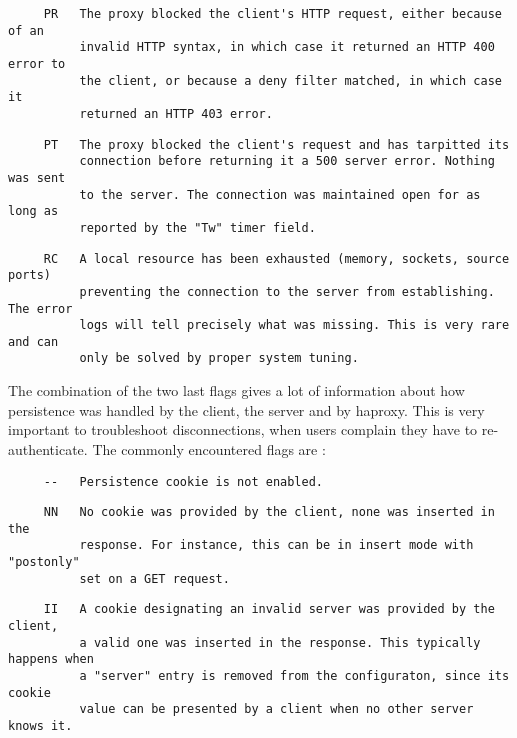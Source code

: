 \begin{verbatim}
     PR   The proxy blocked the client's HTTP request, either because of an
          invalid HTTP syntax, in which case it returned an HTTP 400 error to
          the client, or because a deny filter matched, in which case it
          returned an HTTP 403 error.
\end{verbatim}

\begin{verbatim}
     PT   The proxy blocked the client's request and has tarpitted its
          connection before returning it a 500 server error. Nothing was sent
          to the server. The connection was maintained open for as long as
          reported by the "Tw" timer field.
\end{verbatim}

\begin{verbatim}
     RC   A local resource has been exhausted (memory, sockets, source ports)
          preventing the connection to the server from establishing. The error
          logs will tell precisely what was missing. This is very rare and can
          only be solved by proper system tuning.
\end{verbatim}


The combination of the two last flags gives a lot of information about how
persistence was handled by the client, the server and by haproxy. This is very
important to troubleshoot disconnections, when users complain they have to
re-authenticate. The commonly encountered flags are :

\begin{verbatim}
     --   Persistence cookie is not enabled.
\end{verbatim}

\begin{verbatim}
     NN   No cookie was provided by the client, none was inserted in the
          response. For instance, this can be in insert mode with "postonly"
          set on a GET request.
\end{verbatim}

\begin{verbatim}
     II   A cookie designating an invalid server was provided by the client,
          a valid one was inserted in the response. This typically happens when
          a "server" entry is removed from the configuraton, since its cookie
          value can be presented by a client when no other server knows it.
\end{verbatim}

